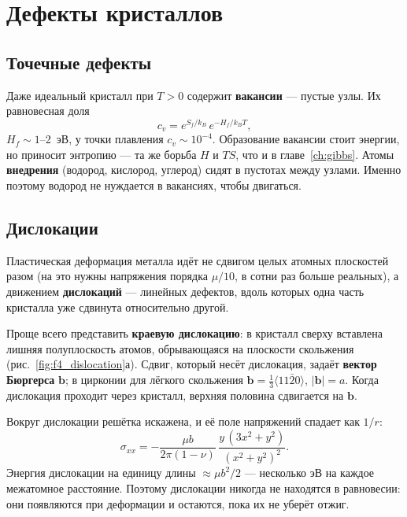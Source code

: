 \chapter{Дефекты кристаллов}\label{ch:defects}

\section{Точечные дефекты}

Даже идеальный кристалл при $T>0$ содержит \textbf{вакансии} --- пустые узлы. Их равновесная доля
\begin{equation}
c_v = e^{S_f/k_B}\,e^{-H_f/k_BT},
\end{equation}
$H_f\sim1$--2~эВ, у точки плавления $c_v\sim10^{-4}$. Образование вакансии стоит энергии, но приносит
энтропию --- та же борьба $H$ и $TS$, что и в главе~\ref{ch:gibbs}. Атомы \textbf{внедрения} (водород, кислород, углерод)
сидят в пустотах между узлами. Именно поэтому водород не нуждается в вакансиях, чтобы двигаться.

\section{Дислокации}

Пластическая деформация металла идёт не сдвигом целых атомных плоскостей разом (на это нужны напряжения порядка
$\mu/10$, в сотни раз больше реальных), а движением \textbf{дислокаций} --- линейных дефектов, вдоль которых
одна часть кристалла уже сдвинута относительно другой.

Проще всего представить \textbf{краевую дислокацию}: в кристалл сверху вставлена лишняя полуплоскость атомов,
обрывающаяся на плоскости скольжения (рис.~\ref{fig:f4_dislocation}а). Сдвиг, который несёт дислокация, задаёт
\textbf{вектор Бюргерса} $\mathbf b$; в цирконии для лёгкого скольжения $\mathbf b = \tfrac13\langle11\bar20\rangle$,
$|\mathbf b| = a$. Когда дислокация проходит через кристалл, верхняя половина сдвигается на $\mathbf b$.


Вокруг дислокации решётка искажена, и её поле напряжений спадает как $1/r$:
\begin{equation}
\sigma_{xx} = -\frac{\mu b}{2\pi(1-\nu)}\,\frac{y\,(3x^2+y^2)}{(x^2+y^2)^2}.
\end{equation}
Энергия дислокации на единицу длины $\approx \mu b^2/2$ --- несколько эВ на каждое межатомное расстояние. Поэтому
дислокации никогда не находятся в равновесии: они появляются при деформации и остаются, пока их не уберёт отжиг.

